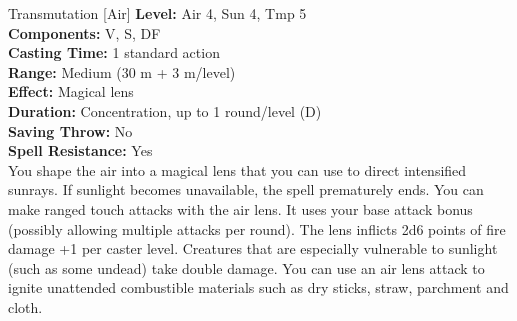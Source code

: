 {Transmutation [Air]}
{
	\textbf{Level:}
	Air 4, Sun 4, Tmp 5\\
	\textbf{Components:}
	V, S, DF\\
	\textbf{Casting Time:}
	1 standard action\\
	\textbf{Range:}
	Medium (30 m + 3 m/level)\\
	\textbf{Effect:}
	Magical lens\\
	\textbf{Duration:}
	Concentration, up to 1 round/level (D)\\
	\textbf{Saving Throw:}
	No\\
	\textbf{Spell Resistance:}
	Yes\\
}
{
	You shape the air into a magical lens that you can use to direct intensified sunrays. If sunlight becomes unavailable, the spell prematurely ends. You can make ranged touch attacks with the air lens. It uses your base attack bonus (possibly allowing multiple attacks per round). The lens inflicts 2d6 points of fire damage +1 per caster level. Creatures that are especially vulnerable to sunlight (such as some undead) take double damage. You can use an air lens attack to ignite unattended combustible materials such as dry sticks, straw, parchment and cloth.
}

